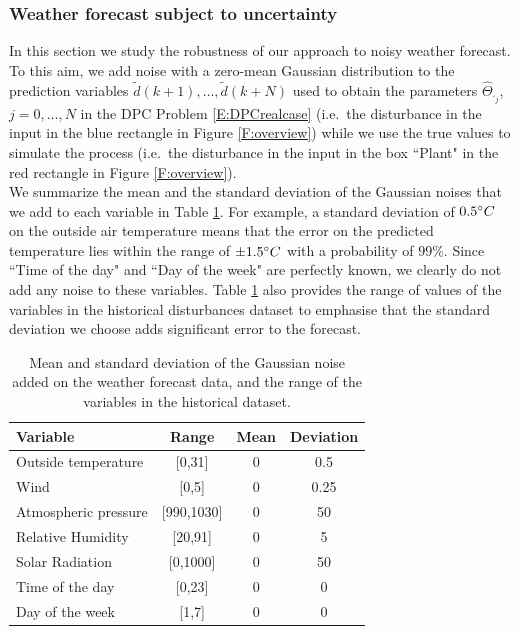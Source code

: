 \subsubsection{Weather forecast subject to uncertainty}\label{SSS:DisturbanceUncertain}

\textcolor[rgb]{0,0,1}{In this section we study the robustness of our approach to noisy weather forecast. To this aim, we add noise with a zero-mean Gaussian distribution to the prediction variables $\tilde d(k+1),\ldots,\tilde d(k+N)$ used to obtain the parameters $\hat \Theta_{\cdot_j}$, $j=0,\ldots,N$ in the DPC Problem \eqref{E:DPCrealcase} (i.e.~the disturbance in the input in the blue rectangle in Figure \ref{F:overview}) while we use the true values to simulate the process (i.e.~the disturbance in the input in the box ``Plant" in the red rectangle in Figure \ref{F:overview}).\\
We summarize the mean and the standard deviation of the Gaussian noises that we add to each variable in Table \ref{T:NoiseParameters}. For example, a standard deviation of $0.5\degree C$ on the outside air temperature means that the error on the predicted temperature lies within the range of $\pm 1.5\degree C$ with a probability of $99\%$. Since ``Time of the day" and ``Day of the week" are perfectly known, we clearly do not add any noise to these variables. Table \ref{T:NoiseParameters} also provides the range of values of the variables in the historical disturbances dataset to emphasise that the standard deviation we choose adds significant error to the forecast.
}

\begin{table}[t!]
	\centering	
	\textcolor[rgb]{0,0,1}{\begin{tabular}{lccc}
		\toprule
		Variable               & Range      & Mean & Deviation \\ 
		\midrule
		Outside temperature    & [0,31]     & 0	   & 0.5       \\
		Wind                   & [0,5] 		& 0    & 0.25      \\
		Atmospheric pressure   & [990,1030] & 0    & 50        \\
		Relative Humidity      & [20,91]	& 0    & 5         \\
		Solar Radiation        & [0,1000]   & 0    & 50        \\
		Time of the day        & [0,23]     & 0    & 0         \\
		Day of the week        & [1,7]      & 0    & 0         \\
		\bottomrule
	\end{tabular}}
	\caption{\textcolor[rgb]{0,0,1}{Mean and standard deviation of the Gaussian noise added on the weather forecast data, and the range of the variables in the historical dataset.}}
	\captionsetup{justification=centering}
	\label{T:NoiseParameters}
\end{table}

